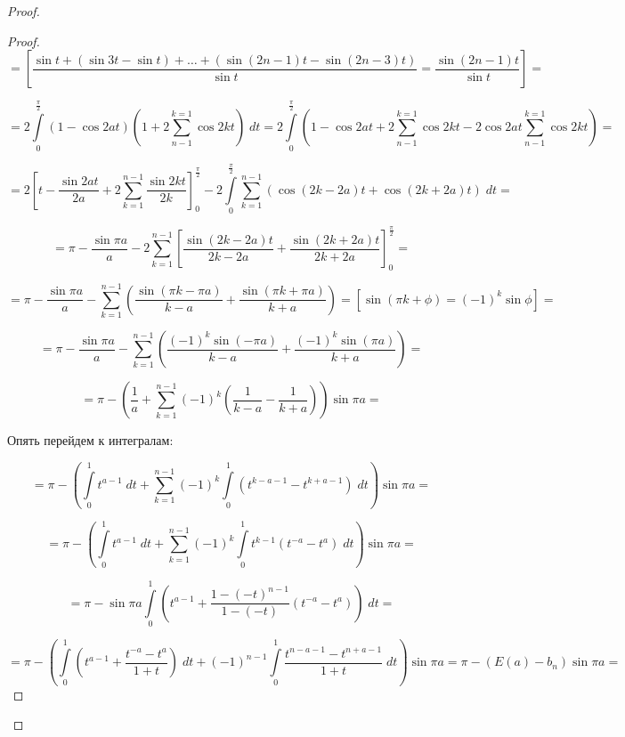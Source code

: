 \documentclass[../../main.tex]{subfiles}
\begin{document}
\begin{proof}
\begin{proof}
				\[  = \left[ \frac{\sin{t} + \left( \sin{3t} - \sin{t} \right) + \dots 
				+\left( \sin{(2n-1)t} - \sin{(2n-3)t} \right) }{\sin{t}} = 
				\frac{\sin{(2n-1)t}}{\sin{t}} \right] =      \]
				
				\[ = 2 \int\limits_{0}^{\frac{\pi}{2}} \left( 1-\cos{2at}\right) \left( 1 
				+ 2 \sum_{n-1}^{k = 1} \cos{2k t} \right) \; dt  = 
				2\int\limits_{0}^{\frac{\pi}{2}} \left( 1-\cos{2at} + 2 \sum_{n-1}^{k = 1} 
				\cos{2k t} - 2 \cos{2at} \sum_{n-1}^{k = 1} \cos{2k t}\right) =   \]
				
				\[  = 2 \left[ t - \frac{\sin{2at}}{2a} + 2 
				\sum_{k=1}^{n-1}\frac{\sin{2kt}}{2k} \right]_{0}^{\frac{\pi}{2}} - 2 
				\int\limits_{0}^{\frac{\pi}{2}} \sum_{k=1}^{n-1} \left( \cos{(2k-2a)t} + 
				\cos{(2k+2a)t} \right) \; dt =            \]
				
				\[  = \pi - \frac{\sin{\pi a}}{a} - 2 \sum_{k=1}^{n-1} \left[ 
				\frac{\sin{(2k-2a)t}}{2k-2a} + \frac{\sin{(2k+2a)t}}{2k+2a} 
				\right]_{0}^{\frac{\pi}{2}} =       \]
				
				\[    = \pi - \frac{\sin{\pi a}}{a} -  \sum_{k=1}^{n-1} \left( 
				\frac{\sin{(\pi k- \pi a)}}{k-a} + \frac{\sin{(\pi k+ \pi a)}}{k+a} 
				\right) = \left[ \sin{(\pi k + \phi) = \left( -1\right)^k \sin{\phi}} 
				\right] =           \]
				
				\[  =   \pi - \frac{\sin{\pi a}}{a} - \sum_{k=1}^{n-1} \left( \frac{(-1)^k 
				\sin{(- \pi a)}}{k-a} + \frac{(-1)^k \sin{(\pi a)}}{k+a} \right)  =        
				  \]
				
				\[ = \pi -\left(  \frac{1}{a} + \sum_{k=1}^{n-1} (-1)^k \left( 
				\frac{1}{k-a} - \frac{1}{k+a} \right)    \right) \sin{\pi a} =        \]
				
				Опять перейдем к интегралам:
				
				\[ = \pi - \left( \int\limits_{0}^{1} t^{a-1} \; dt + \sum_{k=1}^{n-1} 
				(-1)^k \int\limits_{0}^{1} \left( t^{k-a-1} - t^{k+a - 1} \right) \; dt 
				\right)  \sin{\pi a}  =           \]
				
				\[  =  \pi - \left( \int\limits_{0}^{1} t^{a-1} \; dt + \sum_{k=1}^{n-1} 
				(-1)^k \int\limits_{0}^{1} t^{k-1} \left( t^{-a} - t^{a} \right) \; dt 
				\right)  \sin{\pi a} =      \]
				
				\[  = \pi - \sin{\pi a} \int\limits_{0}^{1} \left( t^{a-1} + 
				\frac{1-(-t)^{n-1}}{1-(-t)}\left( t^{-a} - t^{a} \right) \right) \; dt  =  
				    \]
				
				\[ = \pi - \left( \int\limits_{0}^{1} \left( t^{a-1} + \frac{t^{-a} - 
				t^a}{1+t} \right) \; dt + (-1)^{n-1} \int\limits_{0}^{1} \frac{t^{n-a-1} - 
				t^{n+a-1}}{1+t} \; dt   \right) \sin{\pi a}  = \pi - \left( E(a) - b_n 
				\right) \sin{\pi a} =    \]
				

\end{proof}
\end{proof}
\end{document}
